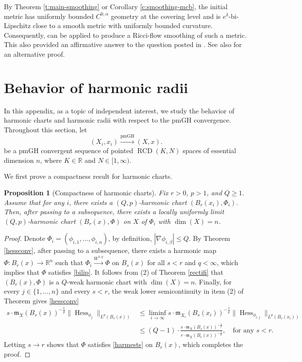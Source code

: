 \documentclass[11pt,reqno]{amsart}
\newtheorem{proposition}[theorem]{Proposition}
\theoremstyle{definition}
\numberwithin{equation}{section}
\newcommand{\dR}{\mathbb{R}}
\newcommand{\meas}{\mathfrak{m}}
\DeclareMathOperator{\Hess}{Hess}
\DeclareMathOperator{\RCD}{RCD}
\begin{document}
By Theorem \ref{t:main-smoothing} or Corollary \ref{c:smoothing-mcb}, the initial metric has uniformly bounded $C^{0,\alpha}$ geometry at the covering level and is $e^{\delta}$-bi-Lipschitz close to a smooth metric with uniformly bounded curvature. Consequently,
\cite[Theorem 1.1]{Simon} can be applied to produce a Ricci-flow smoothing of such a metric. This also provided an affirmative answer to the question posted in \cite[Conjecture 7.5]{Kapovitch}. See also \cite[Theorem 1.7]{wang} for an alternative proof.

 


\appendix \section{Behavior of harmonic radii}\label{secac}
In this appendix, as a topic of independent interest, we study the behavior of harmonic charts and harmonic radii with respect to the pmGH convergence.
Throughout this section, let \begin{equation}\label{harmc}
(X_i, x_i) \xrightarrow{\mathrm{pmGH}} (X, x).
\end{equation} be a pmGH convergent sequence of pointed $\RCD(K, N)$ spaces of essential dimension $n$, where $K\in\dR$ and $N \in [1,\infty)$. 



We first prove a compactness result for harmonic charts.
\begin{proposition}[Compactness of harmonic charts]\label{compac}  
Fix 
  $r>0$,  $p >1$, and $Q \ge 1$. Assume that for any $i$, there exists a $(Q, p)$-harmonic chart $( B_r(x_i), \Phi_i )$. Then, after passing to a subsequence, there exists a locally uniformly limit $(Q, p)$-harmonic chart $(B_r(x), \Phi )$ on $X$ of $\Phi_i$ with $\dim(X)=n$.
\end{proposition}
\begin{proof} Denote $\Phi_i = (\phi_{i, 1}, \ldots, \phi_{i, n} )$, by definition, $|\nabla \phi_{i, \beta}|\leq Q$.
By Theorem \ref{hessconv}, after passing to a subsequence, there exists a harmonic map $\Phi: B_r(x) \to \dR^n$ such that  $\Phi_i \xrightarrow{W^{1,q}} \Phi$ on $B_s(x)$ for all $s <r$ and $q<\infty$, which implies that $\Phi$ satisfies \eqref{bilip}. It follows from (2) of Theorem \ref{rectifi} that $(B_r(x), \Phi)$ is a $Q$-weak harmonic chart with  $\dim (X) = n$.
Finally, for every $j\in\{1,\ldots, n\}$ and every $s<r$, the weak lower semicontinuity in item (2) of Theorem gives \ref{hessconv}
\begin{align*}
s \cdot \meas_X (B_s(x))^{-\frac{1}{p}}\|\Hess_{\phi_j}\|_{L^p(B_s(x))}&\le \liminf_{i \to \infty} s \cdot \meas_{X_i} (B_s(x_i))^{-\frac{1}{p}}\|\Hess_{\phi_{i, j}}\|_{L^p(B_s(x_i))} \nonumber \\
&\le (Q-1)\cdot \frac{s \cdot \meas_{ X }(B_s( x ))^{-\frac{1}{p}}}{r \cdot \meas_{ X } (B_r( x ))^{-\frac{1}{p}}}, \quad \text{for any $s<r$.}
\end{align*}
 Letting $s \to r$ shows that $\Phi$ satisfies \eqref{harmests} on $B_r(x)$, which completes the proof.
\end{proof}
\end{document}
